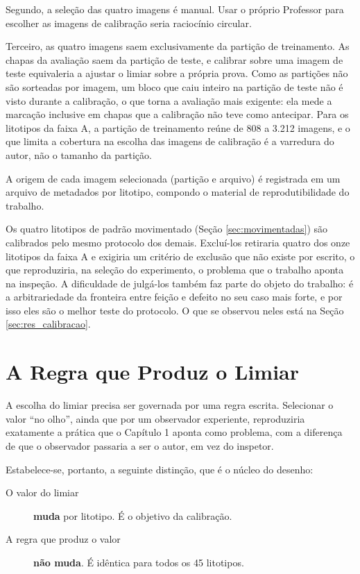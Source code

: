 Segundo, a seleção das quatro imagens é manual. Usar o próprio Professor para escolher as imagens de calibração seria raciocínio circular.

Terceiro, as quatro imagens saem exclusivamente da partição de treinamento. As chapas da avaliação saem da partição de teste, e calibrar sobre uma imagem de teste equivaleria a ajustar o limiar sobre a própria prova. Como as partições não são sorteadas por imagem, um bloco que caiu inteiro na partição de teste não é visto durante a calibração, o que torna a avaliação mais exigente: ela mede a marcação inclusive em chapas que a calibração não teve como antecipar. Para os litotipos da faixa A, a partição de treinamento reúne de 808 a 3.212 imagens, e o que limita a cobertura na escolha das imagens de calibração é a varredura do autor, não o tamanho da partição.

A origem de cada imagem selecionada (partição e arquivo) é registrada em um arquivo de metadados por litotipo, compondo o material de reprodutibilidade do trabalho.

Os quatro litotipos de padrão movimentado (Seção \ref{sec:movimentadas}) são calibrados pelo mesmo protocolo dos demais. Excluí-los retiraria quatro dos onze litotipos da faixa A e exigiria um critério de exclusão que não existe por escrito, o que reproduziria, na seleção do experimento, o problema que o trabalho aponta na inspeção. A dificuldade de julgá-los também faz parte do objeto do trabalho: é a arbitrariedade da fronteira entre feição e defeito no seu caso mais forte, e por isso eles são o melhor teste do protocolo. O que se observou neles está na Seção \ref{sec:res_calibracao}.

\section{A Regra que Produz o Limiar}
\label{sec:regra}

A escolha do limiar precisa ser governada por uma regra escrita. Selecionar o valor ``no olho'', ainda que por um observador experiente, reproduziria exatamente a prática que o Capítulo 1 aponta como problema, com a diferença de que o observador passaria a ser o autor, em vez do inspetor.

Estabelece-se, portanto, a seguinte distinção, que é o núcleo do desenho:

\begin{description}
  \item[O valor do limiar] \textbf{muda} por litotipo. É o objetivo da calibração.
  \item[A regra que produz o valor] \textbf{não muda}. É idêntica para todos os 45 litotipos.
\end{description}

